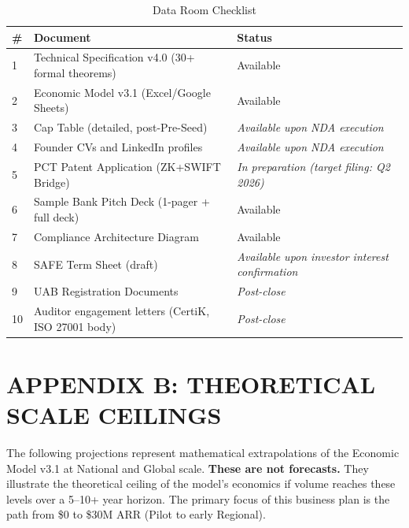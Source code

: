 \documentclass[11pt,a4paper]{article}
\begin{document}
\begin{table}[htbp]
\centering
\caption{Data Room Checklist}
\begin{tabularx}{\linewidth}{@{}lXl@{}}
\toprule
\textbf{\#} & \textbf{Document} & \textbf{Status} \\
\midrule
1 & Technical Specification v4.0 (30+ formal theorems) & Available \\
2 & Economic Model v3.1 (Excel/Google Sheets) & Available \\
3 & Cap Table (detailed, post-Pre-Seed) & \textit{Available upon NDA execution} \\
4 & Founder CVs and LinkedIn profiles & \textit{Available upon NDA execution} \\
5 & PCT Patent Application (ZK+SWIFT Bridge) & \textit{In preparation (target filing: Q2 2026)} \\
6 & Sample Bank Pitch Deck (1-pager + full deck) & Available \\
7 & Compliance Architecture Diagram & Available \\
8 & SAFE Term Sheet (draft) & \textit{Available upon investor interest confirmation} \\
9 & UAB Registration Documents & \textit{Post-close} \\
10 & Auditor engagement letters (CertiK, ISO 27001 body) & \textit{Post-close} \\
\bottomrule
\end{tabularx}
\end{table}


\section*{APPENDIX B: THEORETICAL SCALE CEILINGS}

The following projections represent mathematical extrapolations of the Economic Model v3.1 at National and Global scale. \textbf{These are not forecasts.} They illustrate the theoretical ceiling of the model's economics if volume reaches these levels over a 5--10+ year horizon. The primary focus of this business plan is the path from \$0 to \$30M ARR (Pilot to early Regional).
\end{document}
